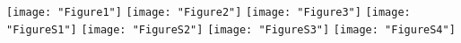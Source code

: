 \documentclass[12pt,a4paper]{article}
\begin{document}
\centering 
\texttt{[image: "Figure1"]}
\pagebreak
\texttt{[image: "Figure2"]}
\pagebreak
\texttt{[image: "Figure3"]}
\pagebreak
\texttt{[image: "FigureS1"]}
\pagebreak
\texttt{[image: "FigureS2"]}
\pagebreak
\texttt{[image: "FigureS3"]}
\pagebreak
\texttt{[image: "FigureS4"]}
\end{document}
